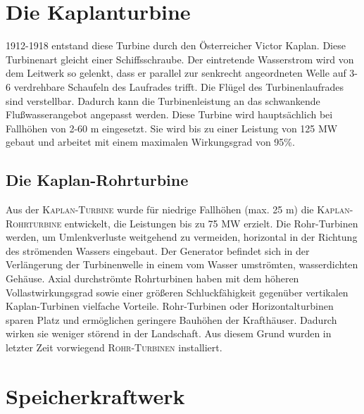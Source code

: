 \documentclass[12pt]{scrbook}
\begin{document}
\newpage

\section{Die Kaplanturbine}

1912-1918 entstand diese Turbine durch den Österreicher Victor Kaplan. Diese
Turbinenart gleicht einer Schiffsschraube. Der eintretende Wasserstrom wird
von dem Leitwerk so gelenkt, dass er parallel zur senkrecht angeordneten Welle
auf 3-6 verdrehbare Schaufeln des Laufrades trifft. Die Flügel des
Turbinenlaufrades sind verstellbar. Dadurch kann die Turbinenleistung an das
schwankende Flußwasserangebot angepasst werden. Diese Turbine wird
hauptsächlich bei Fallhöhen von 2-60 m eingesetzt. Sie wird bis zu einer
Leistung von 125 MW gebaut und arbeitet mit einem maximalen Wirkungsgrad von
95\%.


\subsection{Die Kaplan-Rohrturbine}

Aus der \textsc{Kaplan-Turbine} wurde für niedrige Fallhöhen (max. 25 m) die
\textsc{Kaplan-Rohrturbine} entwickelt, die Leistungen bis zu 75 MW erzielt. Die
Rohr-Turbinen werden, um Umlenkverluste weitgehend zu vermeiden, horizontal in
der Richtung des strömenden Wassers eingebaut. Der Generator befindet sich in
der Verlängerung der Turbinenwelle in einem vom Wasser umströmten,
wasserdichten Gehäuse. Axial durchströmte Rohrturbinen haben mit dem
höheren Vollastwirkungsgrad sowie einer größeren Schluckfähigkeit gegenüber
vertikalen Kaplan-Turbinen vielfache Vorteile. Rohr-Turbinen oder
Horizontalturbinen sparen Platz und ermöglichen geringere Bauhöhen der
Krafthäuser. Dadurch wirken sie weniger störend in der Landschaft. Aus diesem
Grund wurden in letzter Zeit vorwiegend \textsc{Rohr-Turbinen} installiert.


\newpage

\section{Speicherkraftwerk}
\end{document}
